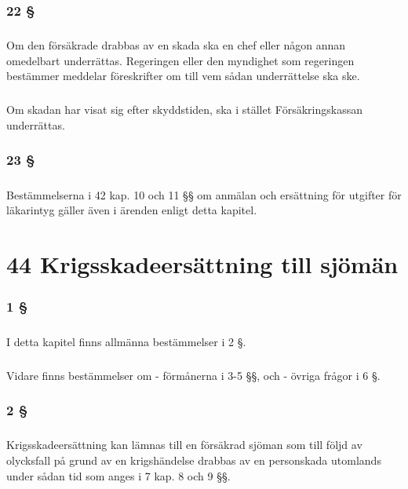 \documentclass[a4paper,notitlepage,openany,10pt]{book}
\begin{document}
\subsection*{22 §}
\paragraph*{}
Om den försäkrade drabbas av en skada ska en chef eller någon annan omedelbart underrättas. Regeringen eller den myndighet som regeringen bestämmer meddelar föreskrifter om till vem sådan underrättelse ska ske.
\paragraph*{}
Om skadan har visat sig efter skyddstiden, ska i stället Försäkringskassan underrättas.
\subsection*{23 §}
\paragraph*{}
Bestämmelserna i 42 kap. 10 och 11 §§ om anmälan och ersättning för utgifter för läkarintyg gäller även i ärenden enligt detta kapitel.
\chapter*{44 Krigsskadeersättning till sjömän}
\subsection*{1 §}
\paragraph*{}
I detta kapitel finns allmänna bestämmelser i 2 §.
\paragraph*{}
Vidare finns bestämmelser om
\newline - förmånerna i 3-5 §§, och
\newline - övriga frågor i 6 §.
\subsection*{2 §}
\paragraph*{}
Krigsskadeersättning kan lämnas till en försäkrad sjöman som till följd av olycksfall på grund av en krigshändelse drabbas av en personskada utomlands under sådan tid som anges i 7 kap. 8 och 9 §§.
\end{document}
